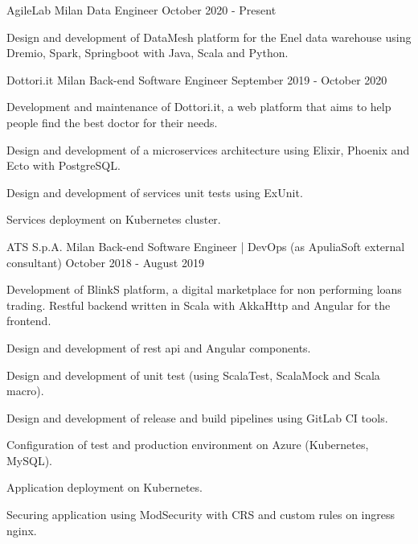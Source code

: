 \documentclass{resume} %
\begin{document}



\cvEntry
  {AgileLab}
  {Milan}
  {Data Engineer}
  {October 2020 - Present}{
    \begin{cvEntryItems}
      \item Design and development of DataMesh platform for the Enel data warehouse using Dremio,
            Spark, Springboot with Java, Scala and Python.
    \end{cvEntryItems}
  }


\cvEntry
  {Dottori.it}
  {Milan}
  {Back-end Software Engineer}
  {September 2019 - October 2020}{
    \begin{cvEntryItems}
      \item Development and maintenance of Dottori.it, a web platform that aims to help people
            find the best doctor for their needs.
      \item Design and development of a microservices architecture using Elixir, Phoenix and
            Ecto with PostgreSQL.
      \item Design and development of services unit tests using ExUnit.
      \item Services deployment on Kubernetes cluster.
    \end{cvEntryItems}
  }


\cvEntry
  {ATS S.p.A.}
  {Milan}
  {Back-end Software Engineer | DevOps (as ApuliaSoft external consultant)}
  {October 2018 - August 2019}{
    \begin{cvEntryItems}
      \item Development of BlinkS platform, a digital marketplace for non performing loans trading.
            Restful backend written in Scala with AkkaHttp and Angular for the frontend.
      \item Design and development of rest api and Angular components.
      \item Design and development of unit test (using ScalaTest, ScalaMock and Scala macro).
      \item Design and development of release and build pipelines using GitLab CI tools.
      \item Configuration of test and production environment on Azure (Kubernetes, MySQL).
      \item Application deployment on Kubernetes.
      \item Securing application using ModSecurity with CRS and custom rules on ingress nginx.
    \end{cvEntryItems}
  }
\end{document}
